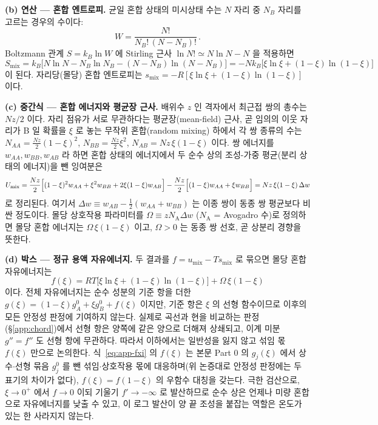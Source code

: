 \documentclass[11pt,a4paper]{article}
\begin{document}
\textbf{(b) 연산 --- 혼합 엔트로피.} 균일 혼합 상태의 미시상태 수는 $N$ 자리 중 $N_B$ 자리를 고르는
경우의 수이다:
\begin{equation}
W=\frac{N!}{N_B!\,(N-N_B)!}\,.
\label{eq:app-W}
\end{equation}
Boltzmann 관계 $S=k_B\ln W$ 에 Stirling 근사 $\ln N!\simeq N\ln N-N$ 을 적용하면
\begin{equation}
S_\mathrm{mix}=k_B\bigl[N\ln N-N_B\ln N_B-(N-N_B)\ln(N-N_B)\bigr]
=-Nk_B\bigl[\xi\ln\xi+(1-\xi)\ln(1-\xi)\bigr]
\label{eq:app-Smix}
\end{equation}
이 된다. 자리당(몰당) 혼합 엔트로피는 $s_\mathrm{mix}=-R[\xi\ln\xi+(1-\xi)\ln(1-\xi)]$ 이다.

\textbf{(c) 중간식 --- 혼합 에너지와 평균장 근사.} 배위수 $z$ 인 격자에서 최근접 쌍의 총수는 $Nz/2$
이다. 자리 점유가 서로 무관하다는 평균장(mean-field) 근사, 곧 임의의 이웃 자리가 B 일 확률을 $\xi$ 로
놓는 무작위 혼합(random mixing) 하에서 각 쌍 종류의 수는 $N_{AA}=\tfrac{Nz}{2}(1-\xi)^2$,
$N_{BB}=\tfrac{Nz}{2}\xi^2$, $N_{AB}=Nz\,\xi(1-\xi)$ 이다. 쌍 에너지를 $w_{AA},w_{BB},w_{AB}$ 라 하면
혼합 상태의 에너지에서 두 순수 상의 조성-가중 평균(분리 상태의 에너지)을 뺀 잉여분은
\begin{equation}
U_\mathrm{mix}
=\frac{Nz}{2}\Bigl[(1-\xi)^2w_{AA}+\xi^2 w_{BB}+2\xi(1-\xi)w_{AB}\Bigr]
-\frac{Nz}{2}\Bigl[(1-\xi)w_{AA}+\xi w_{BB}\Bigr]
=Nz\,\xi(1-\xi)\,\Delta w
\label{eq:app-Umix}
\end{equation}
로 정리된다. 여기서 $\Delta w\equiv w_{AB}-\tfrac12(w_{AA}+w_{BB})$ 는 이종 쌍이 동종 쌍 평균보다
비싼 정도이다. 몰당 상호작용 파라미터를 $\Omega\equiv z N_\mathrm{A}\Delta w$ ($N_\mathrm{A}$ =
Avogadro 수)로 정의하면 몰당 혼합 에너지는 $\Omega\,\xi(1-\xi)$ 이고, $\Omega>0$ 는 동종 쌍 선호,
곧 상분리 경향을 뜻한다.

\textbf{(d) 박스 --- 정규 용액 자유에너지.} 두 결과를 $f=u_\mathrm{mix}-Ts_\mathrm{mix}$ 로 묶으면
몰당 혼합 자유에너지는
\begin{equation}
\boxed{\;f(\xi)=RT\bigl[\xi\ln\xi+(1-\xi)\ln(1-\xi)\bigr]+\Omega\,\xi(1-\xi)\;}
\label{eq:app-fxi}
\end{equation}
이다. 전체 자유에너지는 순수 성분의 기준 항을 더한 $g(\xi)=(1-\xi)g_A^0+\xi g_B^0+f(\xi)$ 이지만,
기준 항은 $\xi$ 의 선형 함수이므로 이후의 모든 안정성 판정에 기여하지 않는다. 실제로 곡선과 현을
비교하는 판정(\S\ref{app:chord})에서 선형 항은 양쪽에 같은 양으로 더해져 상쇄되고, 이계 미분 $g''=f''$
도 선형 항에 무관하다. 따라서 이하에서는 일반성을 잃지 않고 섞임 몫 $f(\xi)$ 만으로 논의한다.
식~\eqref{eq:app-fxi} 의 $f(\xi)$ 는 본문 Part 0 의 $g_j(\xi)$ 에서 상수$\cdot$선형 묶음 $g_j^0$ 를 뺀
섞임$\cdot$상호작용 몫에 대응하며(위 논증대로 안정성 판정에는 두 표기의 차이가 없다),
$f(\xi)=f(1-\xi)$ 의 우함수 대칭을 갖는다. 극한 검산으로, $\xi\to0^+$ 에서 $f\to0$ 이되 기울기 $f'\to-\infty$ 로 발산하므로 순수 상은
언제나 미량 혼합으로 자유에너지를 낮출 수 있고, 이 로그 발산이 양 끝 조성을 붙잡는 역할은 온도가
있는 한 사라지지 않는다.
\end{document}
